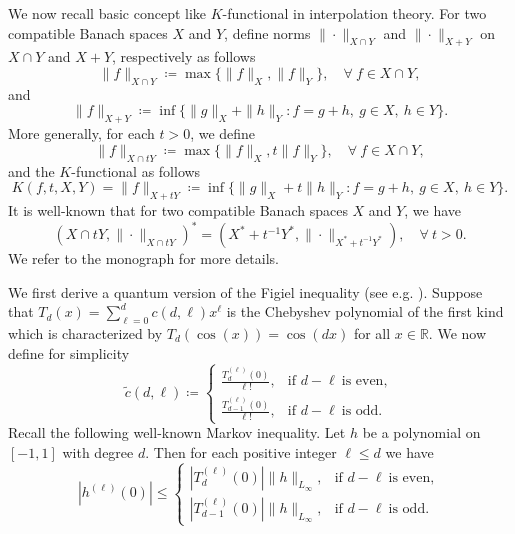 \documentclass{amsbook}
\theoremstyle{definition}
\theoremstyle{remark}
\numberwithin{section}{chapter}
\numberwithin{equation}{chapter}
\newcommand{\1}{\mathbf{1}}
\begin{document}
We now recall basic concept like $K$-functional in interpolation theory. For two compatible Banach spaces $X$ and $Y$, define norms $\|\cdot\|_{X\cap Y}$ and $\|\cdot\|_{X+Y}$ on $X\cap Y$ and $X+Y$, respectively as follows
\[
\|f\|_{X\cap Y}\coloneqq \max\{\|f\|_{X},\|f\|_{Y}\},\quad \forall~ f\in X\cap Y,
\]
and
\[
\|f\|_{X+Y}\coloneqq \inf\{\|g\|_{X}+\|h\|_{Y}:f=g+h,~g\in X,~h\in Y\}.
\]
More generally, for each $t>0$, we define
\[
\|f\|_{X\cap tY}\coloneqq \max\{\|f\|_{X},t\|f\|_{Y}\},\quad \forall~f\in X\cap Y,
\]
and the $K$-functional as follows
\[
K(f,t,X,Y)=\|f\|_{X+tY}\coloneqq \inf\{\|g\|_{X}+t\|h\|_{Y}:f=g+h,~g\in X,~h\in Y\}.
\]
It is well-known that for two compatible Banach spaces $X$ and $Y$, we have
\[
(X\cap tY,\|\cdot\|_{X\cap tY})^{*}=(X^{*}+t^{-1}Y^{*},\|\cdot\|_{X^{*}+t^{-1}Y^{*}}),\quad \forall~t>0.
\]
We refer to the monograph \cite{BL1976} for more details. 


We first derive a quantum version of the Figiel inequality (see e.g. \cite{EI2022}).
Suppose that $T_{d}(x)=\sum_{\ell=0}^{d}c(d,\ell)x^{\ell}$ is the Chebyshev polynomial of the first kind which is characterized by $T_{d}(\cos(x))=\cos(dx)$ for all $x\in \mathbb{R}$. We now define  for simplicity
\[
\tilde{c}(d,\ell)\coloneqq
\begin{cases}
\frac{T^{(\ell)}_{d}(0)}{\ell!},&\mbox{if }d-\ell~\mbox{is even},\\
\frac{T^{(\ell)}_{d-1}(0)}{\ell!},&\mbox{if }d-\ell~\mbox{is odd}.
\end{cases}
\]
Recall the following well-known Markov inequality. Let $h$ be a polynomial on $[-1,1]$ with degree $d$. Then for each positive integer $\ell\leq d$ we have
\begin{equation}\label{Markov inequalities}
|h^{(\ell)}(0)|\leq
\begin{cases}
|T^{(\ell)}_{d}(0)|\|h\|_{L_{\infty}},&\mbox{if }d-\ell~\mbox{is even},\\
|T^{(\ell)}_{d-1}(0)|\|h\|_{L_{\infty}},&\mbox{if }d-\ell~\mbox{is odd}.
\end{cases}
\end{equation}
\end{document}
